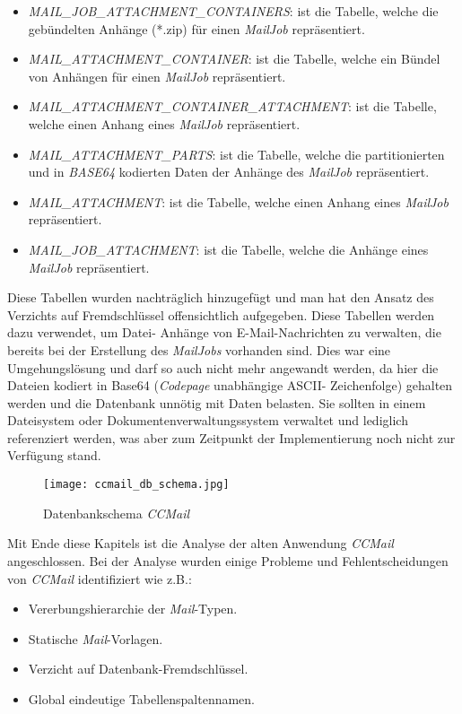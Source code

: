 \begin{itemize}
	\item\emph{MAIL\_JOB\_ATTACHMENT\_CONTAINERS}:
	\newline
	ist die Tabelle, welche die gebündelten Anhänge (*.zip) für einen \emph{MailJob} repräsentiert.
	\item\emph{MAIL\_ATTACHMENT\_CONTAINER}:
	\newline
	ist die Tabelle, welche ein Bündel von Anhängen für einen \emph{MailJob} repräsentiert.
	\item\emph{MAIL\_ATTACHMENT\_CONTAINER\_ATTACHMENT}:
	\newline
	ist die Tabelle, welche einen Anhang eines \emph{MailJob} repräsentiert.
	\item\emph{MAIL\_ATTACHMENT\_PARTS}:
	\newline
	ist die Tabelle, welche die partitionierten und in \emph{BASE64} kodierten Daten der Anhänge des \emph{MailJob} repräsentiert.
	\item\emph{MAIL\_ATTACHMENT}:
	\newline
	ist die Tabelle, welche einen Anhang eines \emph{MailJob} repräsentiert. 
	\item\emph{MAIL\_JOB\_ATTACHMENT}:
	\newline
	ist die Tabelle, welche die Anhänge eines \emph{MailJob} repräsentiert.
\end{itemize}
Diese Tabellen wurden nachträglich hinzugefügt und man hat den Ansatz des Verzichts auf Fremdschlüssel offensichtlich aufgegeben. Diese Tabellen werden dazu verwendet, um Datei- Anhänge von E-Mail-Nachrichten zu verwalten, die bereits bei der Erstellung des \emph{MailJobs} vorhanden sind. Dies war eine Umgehungslösung und darf so auch nicht mehr angewandt werden, da hier die Dateien kodiert in Base64 (\emph{Codepage} unabhängige ASCII- Zeichenfolge) gehalten werden und die Datenbank unnötig mit Daten belasten. Sie sollten in einem Dateisystem oder Dokumentenverwaltungssystem verwaltet und lediglich referenziert werden, was aber zum Zeitpunkt der Implementierung noch nicht zur Verfügung stand. 
\ \newpage
\begin{figure}[H]
\centering
\texttt{[image: ccmail\_db\_schema.jpg]} 
\caption{Datenbankschema \emph{CCMail}}
\label{fig:ccmail-db-schema}
\end{figure}
Mit Ende diese Kapitels ist die Analyse der alten Anwendung \emph{CCMail} angeschlossen. Bei der Analyse wurden einige Probleme und Fehlentscheidungen von \emph{CCMail} identifiziert wie z.B.:
\begin{itemize}
	\item Vererbungshierarchie der \emph{Mail}-Typen.
	\item Statische \emph{Mail}-Vorlagen.
	\item Verzicht auf Datenbank-Fremdschlüssel.
	\item Global eindeutige Tabellenspaltennamen.
\end{itemize}
